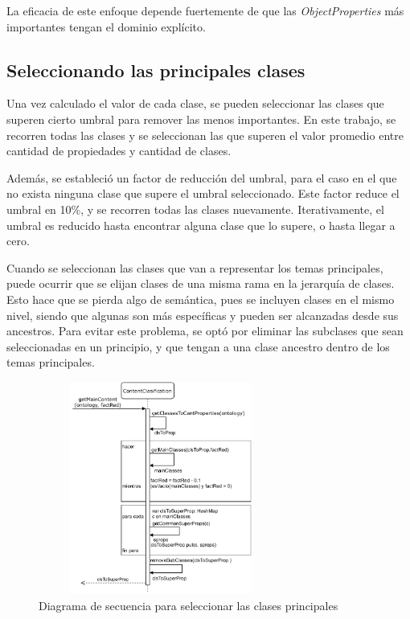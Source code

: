La eficacia de este enfoque depende fuertemente de que las \emph{ObjectProperties} más importantes tengan el dominio explícito.


\subsection{Seleccionando las principales clases}
\label{sec:select_class}
Una vez calculado el valor de cada clase, se pueden seleccionar las clases que superen cierto umbral para remover las menos importantes. En este trabajo, se recorren todas las clases y se seleccionan las que superen el valor promedio entre cantidad de propiedades y cantidad de clases.

Además, se estableció un factor de reducción del umbral, para el caso en el que no exista ninguna clase que supere el umbral seleccionado. Este factor reduce el umbral en 10\%, y se recorren todas las clases nuevamente. Iterativamente, el umbral es reducido hasta encontrar alguna clase que lo supere, o hasta llegar a cero.

Cuando se seleccionan las clases que van a representar los temas principales, puede ocurrir que se elijan clases de una misma rama en la jerarquía de clases. Esto hace que se pierda algo de semántica, pues se incluyen clases en el mismo nivel, siendo que algunas son más específicas y pueden ser alcanzadas desde sus ancestros. Para evitar este problema, se optó por eliminar las subclases que sean seleccionadas en un principio, y que tengan a una clase ancestro dentro de los temas principales.


\begin{figure}[H]
    \centering
    \includegraphics[width=8cm, height=7cm]{img/organizacion_informacion/secuencia_getMainContent.pdf}
    \caption{Diagrama de secuencia para seleccionar las clases principales}
    \label{fig:diagrama_secuencia_getMainContent}
\end{figure}


